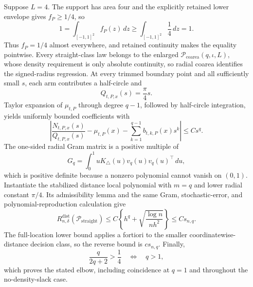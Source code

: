 Suppose \(L=4\).  The support has area four and the explicitly retained lower envelope gives \(f_P\geq1/4\), so
\[
 1=\int_{[-1,1]^2}f_P(z)\,dz
 \geq\int_{[-1,1]^2}\frac14\,dz=1.
\]
Thus \(f_P=1/4\) almost everywhere, and retained continuity makes the equality pointwise.  Every straight-class law belongs to the enlarged \(\mathcal P_{\mathrm{coarea}}(q,\iota,L)\), whose density requirement is only absolute continuity, so radial coarea identifies the signed-radius regression.  At every trimmed boundary point and all sufficiently small \(s\), each arm contributes a half-circle and
\[
 Q_{t,P,x}(s)=\frac\pi4s.
\]
Taylor expansion of \(\mu_{t,P}\) through degree \(q-1\), followed by half-circle integration, yields uniformly bounded coefficients with
\[
 \left|\frac{N_{t,P,x}(s)}{Q_{t,P,x}(s)}-\mu_{t,P}(x)
 -\sum_{k=1}^{q-1}b_{t,k,P}(x)s^k\right|\leq Cs^q.
\]
The one-sided radial Gram matrix is a positive multiple of
\[
 G_q=\int_0^1uK_\triangle(u)v_q(u)v_q(u)^\top\,du,
\]
which is positive definite because a nonzero polynomial cannot vanish on \((0,1)\).  Instantiate the stabilized distance local polynomial with \(m=q\) and lower radial constant \(\pi/4\).  Its admissibility lemma and the same Gram, stochastic-error, and polynomial-reproduction calculation give
\[
 R_{n,\delta}^{\mathrm{dist}}(\mathcal P_{\mathrm{straight}})
 \leq C\left\{h^q+\sqrt{\frac{\log n}{nh^2}}\right\}
 \leq Cs_{n,q}.
\]
The full-location lower bound applies a fortiori to the smaller coordinatewise-distance decision class, so the reverse bound is \(cs_{n,q}\).  Finally,
\[
 \frac{q}{2q+2}>\frac14\quad\Longleftrightarrow\quad q>1,
\]
which proves the stated elbow, including coincidence at \(q=1\) and throughout the no-density-slack case.